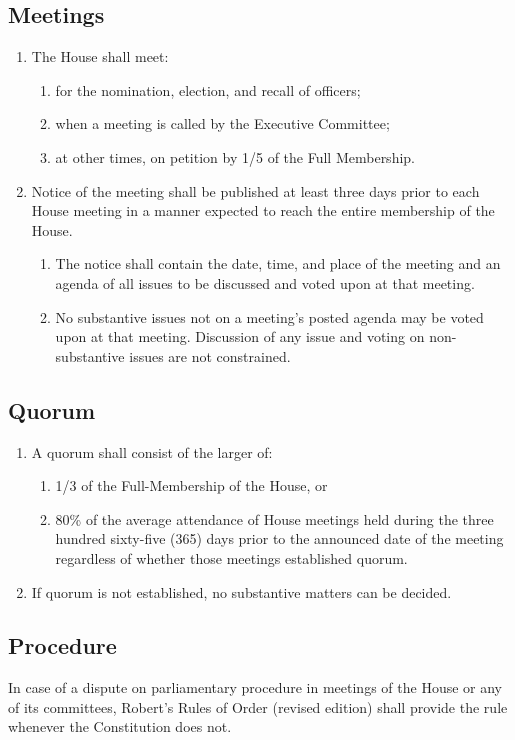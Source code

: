 \documentclass[10pt]{article} %
\begin{document}
\subsection{Meetings}
\begin{enumerate}
\item The House shall meet:
\begin{enumerate}
\item for the nomination, election, and recall of officers;
\item when a meeting is called by the Executive Committee;
\item at other times, on petition by 1/5 of the Full Membership.
\end{enumerate}
\item Notice of the meeting shall be published at least three days prior to each House meeting in a manner expected to reach the entire membership of the House.
\begin{enumerate}
\item The notice shall contain the date, time, and place of the meeting and an agenda of all issues to be discussed and voted upon at that meeting.
\item No substantive issues not on a meeting’s posted agenda may be voted upon at that meeting. Discussion of any issue and voting on non-substantive issues are not constrained.
\end{enumerate}
\end{enumerate}
\subsection{Quorum}
\begin{enumerate}
\item A quorum shall consist of the larger of:
\begin{enumerate}
\item 1/3 of the Full-Membership of the House, or
\item 80\% of the average attendance of House meetings held during the three hundred sixty-five (365) days prior to the announced date of the meeting regardless of whether those meetings established quorum.
\end{enumerate}
\item If quorum is not established, no substantive matters can be decided.
\end{enumerate}
\subsection{Procedure}
In case of a dispute on parliamentary procedure in meetings of the House or any of its committees, Robert’s Rules of Order (revised edition) shall provide the rule whenever the Constitution does not.
\end{document}
